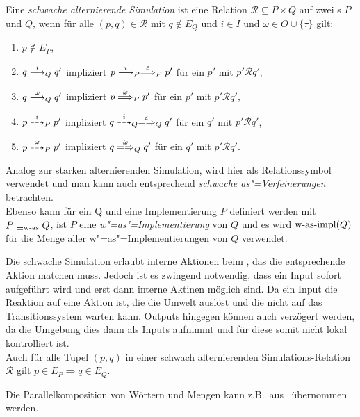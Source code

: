 \begin{Def}
  \label{wSimDef}
  Eine \emph{schwache alternierende Simulation} ist eine Relation $\mathcal{R}
  \subseteq P  \times Q$ auf zwei \MEIO{}s $P$ und $Q$, wenn für alle $(p,q)
  \in \mathcal{R}$ mit $q\notin E_Q$ und $i\in I$ und $\omega\in O\cup\{\tau\}$
  gilt:
  \begin{enumerate}
    \item $p\notin E_P$,
    \item $q\must[i]_Q q'$ impliziert $p\must[i]_P\weakmust[\varepsilon]_P p'$
      für ein $p'$ mit $p'\mathcal{R}q'$,
    \item $q\must[\omega]_Q q'$ impliziert $p\weakmust[\hat{\omega}]_P p'$ für
      ein $p'$ mit $p'\mathcal{R}q'$,
    \item $p\may[i]_P p'$ impliziert $q\may[i]_Q\weakmay[\varepsilon]_Q q'$ für
      ein $q'$ mit $p'\mathcal{R}q'$,
    \item $p\may[\omega]_P p'$ impliziert $q\weakmay[\hat{\omega}]_Q q'$ für
      ein $q'$ mit $p'\mathcal{R}q'$.
  \end{enumerate}
  Analog zur starken alternierenden Simulation, wird hier \wasRel{} als
  Relationssymbol verwendet und man kann auch entsprechend \emph{schwache
  as"=Verfeinerungen} betrachten.\\
  Ebenso kann \wasRel{} für ein \MEIO{} Q und eine Implementierung $P$
  definiert werden mit $P\sqsubseteq _{\mathrm{w}\text{-}\mathrm{as}} Q$, ist $P$ eine \emph{w"=as"=Implementierung}
  von $Q$ und es wird $\mathrm{w}\text{-}\mathrm{as}\text{-}\mathrm{impl} (Q)$ für die Menge aller
  w"=as"=Implementierungen von $Q$ verwendet.
\end{Def}

Die schwache Simulation erlaubt interne Aktionen beim \MEIO{}, das die
entsprechende Aktion matchen muss. Jedoch ist es zwingend notwendig, dass ein
Input sofort aufgeführt wird und erst dann interne Aktinen möglich sind. Da
ein Input die Reaktion auf eine Aktion ist, die die Umwelt auslöst und die
nicht auf das Transitionssystem warten kann. Outputs hingegen können auch
verzögert werden, da die Umgebung dies dann als Inputs aufnimmt und für diese
somit nicht lokal kontrolliert ist.\\
Auch für alle Tupel $(p,q)$ in einer schwach alternierenden
Simulations-Relation $\mathcal{R}$ gilt $p\in E_P\Rightarrow q\in E_Q$.

Die Parallelkomposition von Wörtern und Mengen kann z.B.\
aus~\cite{Vogler2014EIO} übernommen werden.

